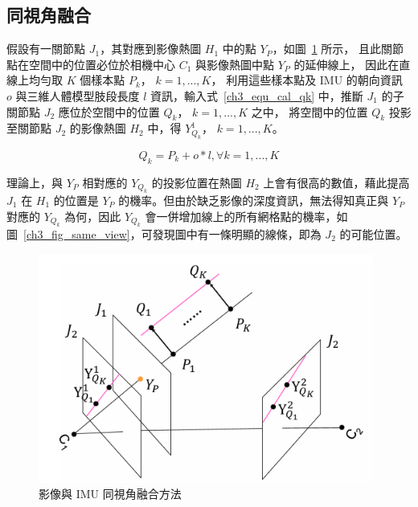 \subsection{同視角融合}
假設有一關節點 $J_1$，其對應到影像熱圖 $H_1$ 中的點 $Y_P$，如圖~\ref{ch3_fig_joint_project} 所示，
且此關節點在空間中的位置必位於相機中心 $C_1$ 與影像熱圖中點 $Y_P$ 的延伸線上，
因此在直線上均勻取 $K$ 個樣本點 $P_k$， $k = 1, ..., K$，
利用這些樣本點及 IMU 的朝向資訊 $o$ 與三維人體模型肢段長度 $l$ 資訊，輸入式~\ref{ch3_equ_cal_qk} 中，推斷 $J_1$ 的子關節點 $J_2$ 應位於空間中的位置 $Q_k$， $k = 1, ..., K$ 之中，
將空間中的位置 $Q_k$ 投影至關節點 $J_2$ 的影像熱圖 $H_2$ 中，得 $Y^1_{Q_k}$， $k = 1, ..., K$。

\begin{equation}
   Q_k=P_k+o*l, \forall k=1,...,K
   \label{ch3_equ_cal_qk}
\end{equation}

理論上，與 $Y_P$ 相對應的 $Y_{Q_k}$ 的投影位置在熱圖 $H_2$ 上會有很高的數值，藉此提高 $J_1$ 在 $H_1$ 的位置是 $Y_P$ 的機率。但由於缺乏影像的深度資訊，無法得知真正與 $Y_P$ 對應的 $Y_{Q_k}$ 為何，因此 $Y_{Q_k}$ 會一併增加線上的所有網格點的機率，如圖~\ref{ch3_fig_same_view}，可發現圖中有一條明顯的線條，即為 $J_2$ 的可能位置。

\begin{figure}[!ht]
   \centering
   \includegraphics[width=11cm]{figure/ch3_fig_joint_project.png}
    \caption[影像與 IMU 同視角融合方法]{影像與 IMU 同視角融合方法}
    \label{ch3_fig_joint_project}
\end{figure}

